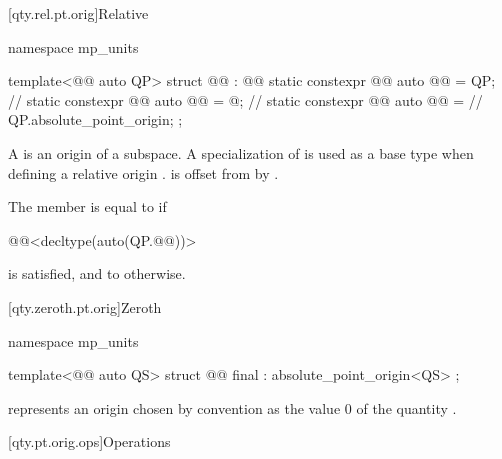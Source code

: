 [qty.rel.pt.orig]{Relative}

\begin{codeblock}
namespace mp_units {

template<@@ auto QP>
struct @@ : @@ {
  static constexpr @@ auto @@ = QP;       // \expos
  static constexpr @@ auto @@ = @\seebelownc@;  // \expos
  static constexpr @@ auto @@ =      // \expos
    QP.absolute_point_origin;
};

}
\end{codeblock}

\pnum
A  is an origin
of a subspace.
A specialization of  is used as a base type when defining a relative origin .
 is offset from  by .

\pnum
The member  is equal to
 if
\begin{codeblock}
@@<decltype(auto(QP.@@))>
\end{codeblock}
is satisfied, and
to  otherwise.

[qty.zeroth.pt.orig]{Zeroth}

\begin{codeblock}
namespace mp_units {

template<@@ auto QS>
struct @@ final : absolute_point_origin<QS> {};

}
\end{codeblock}

\pnum
{} represents an origin
chosen by convention as the value $0$ of the quantity .

[qty.pt.orig.ops]{Operations}

